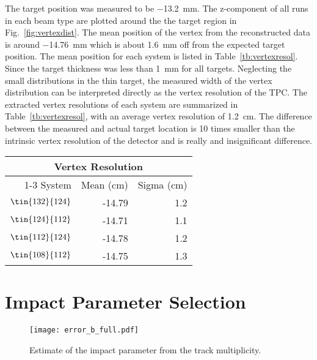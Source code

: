  The target position was measured to be \SI{-13.2}{\milli\metre}. The z-component of all runs in each beam type are plotted around the the target region in Fig.~\ref{fig:vertexdist}. The mean position of the vertex from the reconstructed data is around \SI{-14.76}{\milli\metre} which is about \SI{1.6}{\milli\metre} off from the expected target position. The mean position for each system is listed in Table~\ref{tb:vertexresol}. Since the target thickness was less than \SI{1}{\milli\metre} for all targets. Neglecting the small distributions in the thin target, the measured width of the vertex distribution can be interpreted directly as the vertex resolution of the TPC. The extracted vertex resolutions of each system are summarized in Table~\ref{tb:vertexresol}, with an average vertex resolution of \SI{1.2}{\centi\metre}. The difference between the measured and actual target location is 10 times smaller than the intrinsic vertex resolution of the detector and is really and insignificant difference.  



\begin{table*}\centering
{}
\begin{tabular}{@{}rrr@{}}\toprule
\multicolumn{3}{c}{Vertex Resolution}\\
\cmidrule{1-3}
System & Mean (cm) & Sigma (cm) \\
\midrule
$\tin{132}{124}$ & -14.79  & 1.2 \\
$\tin{124}{112}$ & -14.71  & 1.1 \\
$\tin{112}{124}$ & -14.78  & 1.2 \\
$\tin{108}{112}$ & -14.75  & 1.3 \\ 
\bottomrule
\end{tabular}
\caption{Summary of measured verticies and their resolution.}
\label{tb:vertexresol}
\end{table*}


\clearpage

\section{Impact Parameter Selection}

\begin{figure}[htb]
\centering
\texttt{[image: error\_b\_full.pdf]}
\caption{Estimate of the impact parameter from the track multiplicity.}
\label{fig:impactPar}
\end{figure}


